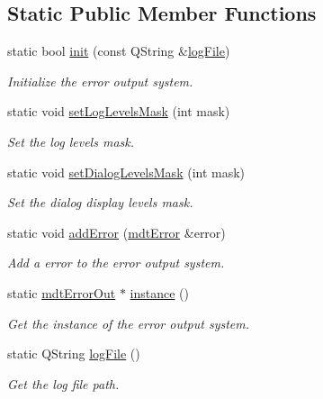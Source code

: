 \subsection*{Static Public Member Functions}
\begin{DoxyCompactItemize}
\item 
static bool \hyperlink{classmdt_error_out_a9c7f05b03d0f09ff02e8f747bdcd1de7}{init} (const Q\-String \&\hyperlink{classmdt_error_out_a22f721fff4d6368a4a3d51279c6af8fa}{log\-File})
\begin{DoxyCompactList}\small\item\em Initialize the error output system. \end{DoxyCompactList}\item 
static void \hyperlink{classmdt_error_out_a547e4e8aa75528710e4a17e9faf48621}{set\-Log\-Levels\-Mask} (int mask)
\begin{DoxyCompactList}\small\item\em Set the log levels mask. \end{DoxyCompactList}\item 
static void \hyperlink{classmdt_error_out_afa76bdf497b750829277566ec07d44d8}{set\-Dialog\-Levels\-Mask} (int mask)
\begin{DoxyCompactList}\small\item\em Set the dialog display levels mask. \end{DoxyCompactList}\item 
static void \hyperlink{classmdt_error_out_aeb562e93216b34e7b73aa69f42065895}{add\-Error} (\hyperlink{classmdt_error}{mdt\-Error} \&error)
\begin{DoxyCompactList}\small\item\em Add a error to the error output system. \end{DoxyCompactList}\item 
static \hyperlink{classmdt_error_out}{mdt\-Error\-Out} $\ast$ \hyperlink{classmdt_error_out_a7a80480a61ca1a2704ec16d69647f739}{instance} ()
\begin{DoxyCompactList}\small\item\em Get the instance of the error output system. \end{DoxyCompactList}\item 
static Q\-String \hyperlink{classmdt_error_out_a22f721fff4d6368a4a3d51279c6af8fa}{log\-File} ()
\begin{DoxyCompactList}\small\item\em Get the log file path. \end{DoxyCompactList}\item 

\end{DoxyCompactItemize}
